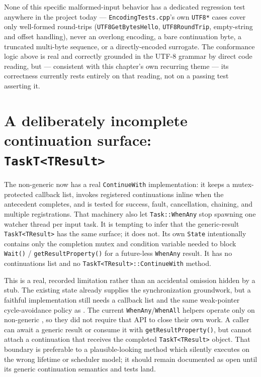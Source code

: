 None of this specific malformed-input behavior has a dedicated regression test anywhere in the
project today --- \texttt{EncodingTests.cpp}'s own \texttt{UTF8*} cases cover only well-formed
round-trips (\texttt{UTF8GetBytesHello}, \texttt{UTF8RoundTrip}, empty-string and offset
handling), never an overlong encoding, a bare continuation byte, a truncated multi-byte
sequence, or a directly-encoded surrogate. The conformance logic above is real and correctly
grounded in the UTF-8 grammar by direct code reading, but --- consistent with this chapter's
own recurring theme --- its correctness currently rests entirely on that reading, not on a
passing test asserting it.

\section{A deliberately incomplete continuation surface: \texttt{TaskT<TResult>}}

The non-generic  now has a real \texttt{ContinueWith} implementation: it keeps a
mutex-protected callback list, invokes registered continuations inline when the antecedent
completes, and is tested for success, fault, cancellation, chaining, and multiple registrations.
That machinery also let \texttt{Task::WhenAny} stop spawning one watcher thread per input task.
It is tempting to infer that the generic-result \texttt{TaskT<TResult>} has the same surface;
it does not. Its own \texttt{State} intentionally contains only the completion mutex and
condition variable needed to block \texttt{Wait()} / \texttt{getResultProperty()} for a
future-less \texttt{WhenAny} result. It has no continuations list and no
\texttt{TaskT<TResult>::ContinueWith} method.

This is a real, recorded limitation rather than an accidental omission hidden by a stub. The
existing state already supplies the synchronization groundwork, but a faithful implementation
still needs a callback list and the same weak-pointer cycle-avoidance policy as .
The current \texttt{WhenAny}/\texttt{WhenAll} helpers operate only on non-generic
, so they did not require that API to close their own work. A caller can await a
generic result or consume it with \texttt{getResultProperty()}, but cannot attach a continuation
that receives the completed \texttt{TaskT<TResult>} object. That boundary is preferable to a
plausible-looking method which silently executes on the wrong lifetime or scheduler model; it
should remain documented as open until its generic continuation semantics and tests land.

